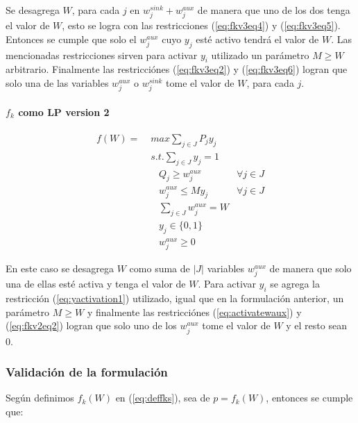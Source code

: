 \documentclass{article}
\begin{document}
  Se desagrega $W$, para cada $j$ en $w^{sink}_j + w^{aux}_j$ de manera que uno de los dos tenga el valor de $W$, esto se logra con las restricciones (\ref{eq:fkv3eq4}) y (\ref{eq:fkv3eq5}). Entonces se cumple que solo el $w^{aux}_j$ cuyo $y_j$ esté activo tendrá el valor de $W$. Las mencionadas restricciones sirven para activar $y_i$ utilizado un parámetro $M \geq W$ arbitrario. Finalmente las restricciónes (\ref{eq:fkv3eq2}) y (\ref{eq:fkv3eq6}) logran que solo una de las variables $w^{aux}_j$ o $w^{sink}_j$ tome el valor de $W$, para cada $j$.

  \paragraph*{$f_k$ como LP version 2}

  \begin{align}
    f(W) =\; & max \sum_{j \in J} P_j y_j             & \label{eq:fkv2eq1}\\
             & s.t. \sum_{j \in J} y_j = 1            & \label{eq:fkv2eq2}\\
             & \;\;\; Q_j \geq w^{aux}_j              & \forall j \in J \label{eq:implfkoriginalineq} \\
             & \;\;\; w^{aux}_j \leq M y_j            & \forall j \in J \label{eq:yactivation1} \\
             & \;\;\; \sum_{j \in J} w^{aux}_j = W    & \label{eq:activatewaux} \\
             & \;\;\; y_j \in \{0,1\}                 & \label{eq:fkv2domainy} \\
             & \;\;\; w^{aux}_j \geq 0                & \label{eq:fkv2eq6}
  \end{align}

  En este caso se desagrega $W$ como suma de $|J|$ variables $w^{aux}_j$ de manera que solo una de ellas esté activa y tenga el valor de $W$. Para activar $y_i$ se agrega la restricción (\ref{eq:yactivation1}) utilizado, igual que en la formulación anterior, un parámetro $M \geq W$ y finalmente las restricciónes (\ref{eq:activatewaux}) y (\ref{eq:fkv2eq2}) logran que solo uno de los $w^{aux}_j$ tome el valor de $W$ y el resto sean 0.

  \subsubsection*{Validación de la formulación}

  Según definimos $f_k(W)$ en (\ref{eq:deffks}), sea de $p = f_k(W)$, entonces se cumple que:
\end{document}
